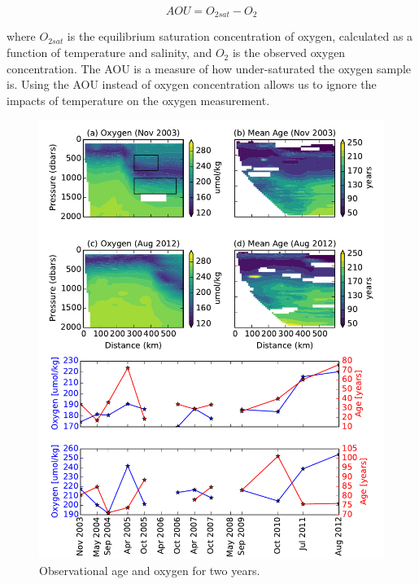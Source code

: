\begin{equation}
AOU = O_{2 sat} - O_2
\end{equation}

where $O_{2 sat}$ is the equilibrium saturation concentration of oxygen,
calculated as a function of temperature and salinity, and $O_2$ is the observed
oxygen concentration. The AOU is a measure of how under-saturated the oxygen sample
is. Using the AOU instead of oxygen concentration allows us to ignore the impacts
of temperature on the oxygen measurement.


\begin{figure}
\centering
\includegraphics[width=\linewidth]{age_oxygen_ts.pdf}
\caption{Observational age and oxygen for two years.}
\label{fig:obs_age_oxygen}
\end{figure}

